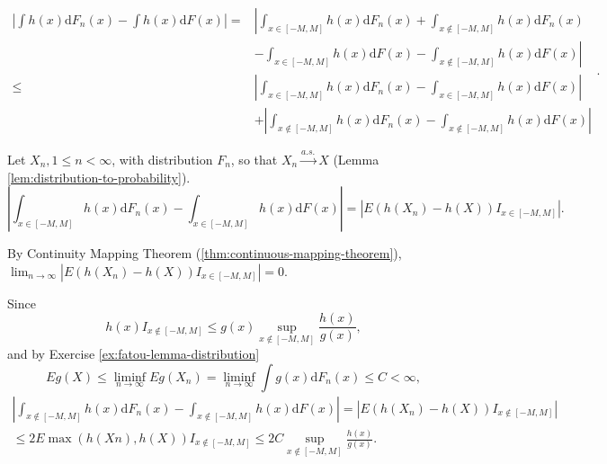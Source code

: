 \begin{solution}
    \begin{equation*}
        \begin{aligned}
            \left|\int h(x)\mathrm{d}F_{n}(x)-\int h(x)\mathrm{d}F(x)\right| = & \left|{\int_{x\in[-M,M]}h(x)\mathrm{d}F_{n}(x)+\int_{x\notin[-M,M]}h(x)\mathrm{d}F_{n}(x)}\right. \\
                                                                               & \left.{-\int_{x\in[-M,M]}h(x)\mathrm{d}F(x)-\int_{x\notin[-M,M]}h(x)\mathrm{d}F(x)}\right|        \\
            \leq                                                               & \left|\int_{x\in[-M,M]}h(x)\mathrm{d}F_{n}(x)-\int_{x\in[-M,M]}h(x)\mathrm{d}F(x)\right|          \\
                                                                               & + \left|\int_{x\notin[-M,M]}h(x)\mathrm{d}F_{n}(x)-\int_{x\notin[-M,M]}h(x)\mathrm{d}F(x)\right|
        \end{aligned}.
    \end{equation*}

    Let $X_n,1\leq n<\infty$, with distribution $F_n$, so that $X_n\stackrel{a.s.}{\rightarrow}X$ (Lemma \ref{lem:distribution-to-probability}).
    \begin{equation*}
        \left|\int_{x\in[-M,M]}h(x)\mathrm{d}F_{n}(x)-\int_{x\in[-M,M]}h(x)\mathrm{d}F(x)\right| = \left|E\left(h(X_n)-h(X)\right)I_{x\in[-M,M]}\right|.
    \end{equation*}

    By Continuity Mapping Theorem (\ref{thm:continuous-mapping-theorem}), $\lim_{n\rightarrow\infty}\left|E\left(h(X_n)-h(X)\right)I_{x\in[-M,M]}\right| = 0$.

    Since
    \begin{equation*}
        h(x)I_{x\notin[-M,M]}\leq g(x)\sup_{x\notin[-M,M]}\frac{h(x)}{g(x)},
    \end{equation*}
    and by Exercise \ref{ex:fatou-lemma-distribution}
    \begin{equation*}
        Eg(X) \leq \liminf_{n\rightarrow\infty}Eg(X_n)=\liminf_{n\rightarrow\infty}\int g(x)\mathrm{d}F_{n}(x)\leq C<\infty,
    \end{equation*}
    \begin{equation*}
        \begin{aligned}
            \left|\int_{x\notin[-M,M]}h(x)\mathrm{d}F_{n}(x)-\int_{x\notin[-M,M]}h(x)\mathrm{d}F(x)\right| = \left|E\left(h(X_n)-h(X)\right)I_{x\notin[-M,M]}\right| \\
            \leq 2E\max(h(Xn),h(X))I_{x\notin[-M,M]}\leq 2C\sup_{x\notin[-M,M]}\frac{h(x)}{g(x)}.                                                                    \\
        \end{aligned}
    \end{equation*}


\end{solution}
